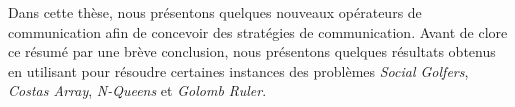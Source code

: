 Dans cette th\`ese, nous pr\'esentons quelques nouveaux op\'erateurs de communication afin de concevoir des strat\'egies de communication. Avant de clore ce résumé par une br\`eve conclusion, nous pr\'esentons quelques r\'esultats obtenus en utilisant \posl{} pour r\'esoudre certaines instances des probl\`emes {\it Social Golfers}, {\it Costas Array}, \textit{N-Queens} et \textit{Golomb Ruler}.